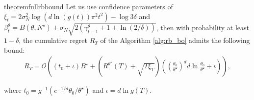 \documentclass{article}
\theoremstyle{plain}
\theoremstyle{definition}
\theoremstyle{remark}
\theoremstyle{plain}
\begin{document}
\begin{restatable}[]{theorem}{fullrbbound}
\label{thm:fullrbbound}
    Let us use confidence parameters of $\xi_t = 2 \sigma_N^2 \log \left(d\ln(g(t))\pi^2 t^2\right) - \log 3\delta $ and $\beta^{\theta}_t = B(\theta, N^\star) + \sigma_N \sqrt{2 (\gamma^{\theta}_{t-1} + 1 + \ln (2/\delta))}$, then
  with probability at least $1 - \delta$, the cumulative regret $R_T$ of the Algorithm \ref{alg:rb_bo} admits the following bound:
\begin{align*}
    R_T = \mathcal{O} \left(\left(t_0+ \iota \right)B^\star + \left(R^{\theta^\star}(T) + \sqrt{T\xi_T}  \right) \left(\left(\frac{\theta_0}{\theta^\star} \right)^{d} d \ln \frac{\theta_0}{\theta^\star}  + \iota \right) \right),
\end{align*}
     
where $t_0 = g^{-1}\left(e^{-1/d}\theta_0/\theta^\star \right)$ and $\iota = d \ln g(T)$. 
\end{restatable}
\end{document}
